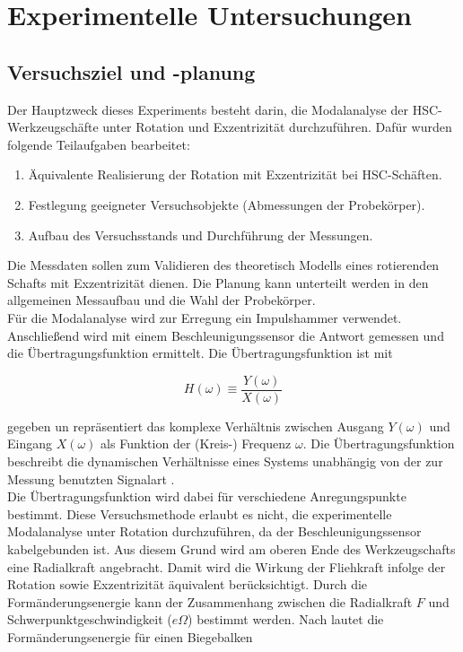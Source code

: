 	\pagestyle{fancy}

	\section{Experimentelle Untersuchungen} \label{sec:Experimentelle Untersuchungen}

	\subsection{Versuchsziel und -planung}\label{sec:Versuchsziel und -planung}
	
	Der Hauptzweck dieses Experiments besteht darin, die Modalanalyse der HSC-Werkzeugschäfte unter Rotation und Exzentrizität durchzuführen. Dafür wurden folgende Teilaufgaben bearbeitet:
	
	\begin{enumerate}
		\item Äquivalente Realisierung der Rotation mit Exzentrizität bei HSC-Schäften.
		\item Festlegung geeigneter Versuchsobjekte (Abmessungen der Probekörper).
		\item Aufbau des Versuchsstands und Durchführung der Messungen.
	\end{enumerate}
	
	Die Messdaten sollen zum Validieren des theoretisch Modells eines rotierenden Schafts mit Exzentrizität dienen. Die Planung kann unterteilt werden in den allgemeinen Messaufbau und die Wahl der Probekörper.
	\\
	Für die Modalanalyse wird zur Erregung ein Impulshammer verwendet. Anschließend wird mit einem Beschleunigungssensor die Antwort gemessen und die Übertragungsfunktion ermittelt. Die Übertragungsfunktion ist mit
	

	
	\begin{equation}\label{equ:Übertragungsfunktion}
	H(\omega)\equiv \dfrac{Y(\omega)}{X(\omega)}
	\end{equation}
	
	gegeben un repräsentiert das komplexe Verhältnis zwischen Ausgang $ Y(\omega) $ und Eingang $ X(\omega) $ als Funktion der	(Kreis-) Frequenz $ \omega $. Die Übertragungsfunktion beschreibt die dynamischen Verhältnisse eines Systems unabhängig von der zur Messung benutzten Signalart \cite{dossing1989strukturen}.\\
	 
	Die Übertragungsfunktion wird dabei für verschiedene Anregungspunkte bestimmt. Diese Versuchsmethode erlaubt es nicht, die experimentelle Modalanalyse unter Rotation durchzuführen, da der Beschleunigungssensor kabelgebunden ist. Aus diesem Grund wird am oberen Ende des Werkzeugschafts eine Radialkraft angebracht. Damit wird die Wirkung der Fliehkraft infolge der Rotation sowie Exzentrizität äquivalent berücksichtigt. Durch die Formänderungsenergie kann der Zusammenhang zwischen die Radialkraft $ F $ und Schwerpunktgeschwindigkeit ($e \Omega$) bestimmt werden. Nach \cite{gross2017technische} lautet die Formänderungsenergie für einen Biegebalken 
	
